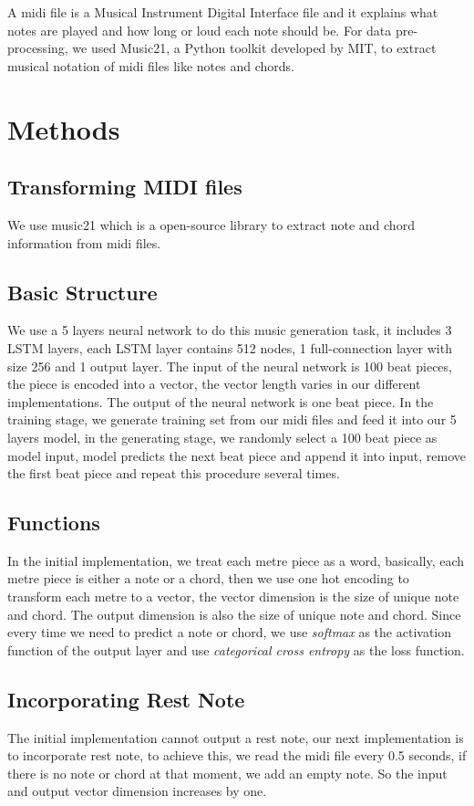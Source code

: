 \documentclass[conference]{IEEEtran}
\begin{document}
A midi file is a Musical Instrument Digital Interface file and it explains what notes are played and how long or loud each note should be. For data pre-processing, we used Music21, a Python toolkit developed by MIT, to extract musical notation of midi files like notes and chords.

\section{Methods}

\subsection{Transforming MIDI files}
We use music21 which is a open-source library to extract note and chord information from midi files.

\subsection{Basic Structure}
We use a 5 layers neural network to do this music generation task, it includes 3 LSTM layers, each LSTM layer contains 512 nodes, 1 full-connection layer with size 256 and 1 output layer. The input of the neural network is 100 beat pieces, the piece is encoded into a vector, the vector length varies in our different implementations. The output of the neural network is one beat piece. In the training stage, we generate training set from our midi files and feed it into our 5 layers model, in the generating stage, we randomly select a 100 beat piece as model input, model predicts the next beat piece and append it into input, remove the first beat piece and repeat this procedure several times.

\subsection{Functions}
In the initial implementation, we treat each metre piece as a word, basically, each metre piece is either a note or a chord, then we use one hot encoding to transform each metre to a vector, the vector dimension is the size of unique note and chord. The output dimension is also the size of unique note and chord. Since every time we need to predict a note or chord, we use \textit{softmax} as the activation function of the output layer and use \textit{categorical cross entropy} as the loss function.

\subsection{Incorporating Rest Note}
The initial implementation cannot output a rest note, our next implementation is to incorporate rest note, to achieve this, we read the midi file every 0.5 seconds, if there is no note or chord at that moment, we add an empty note. So the input and output vector dimension increases by one.
\end{document}
